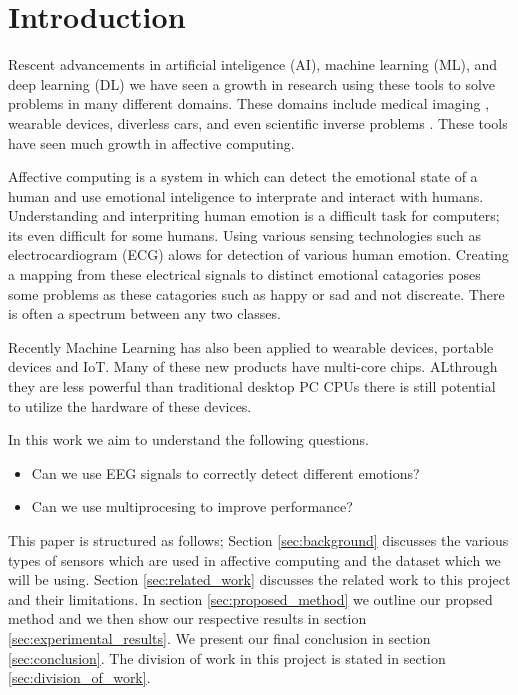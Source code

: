 \section{Introduction}
Rescent advancements in
artificial inteligence (AI),
machine learning (ML),
and deep learning (DL)
we have seen a growth in
research using these tools to
solve problems in many different domains.
These domains include medical imaging \cite{Greenspan:2016},
wearable devices,
diverless cars,
and even scientific inverse problems \cite{laanait2019exascale}.
These tools have seen much growth in affective computing.

Affective computing is a system in which can detect the
emotional state of a human and use emotional inteligence
to interprate and interact with humans.
Understanding and interpriting human emotion is a
difficult task for computers;
its even difficult for some humans.
Using various sensing technologies such as electrocardiogram (ECG)
alows for detection of various human emotion.
Creating a mapping from these electrical signals to
distinct emotional catagories poses some problems as
these catagories such as happy or sad and not discreate.
There is often a spectrum between any two classes.

Recently Machine Learning has also been applied to wearable devices,
portable devices and IoT.
Many of these new products have multi-core chips.
ALthrough they are less powerful than traditional desktop PC
CPUs there is still potential to utilize the hardware of these devices.

In this work we aim to understand the following questions.
\begin{itemize}
    \item Can we use EEG signals to correctly detect different emotions?
    \item Can we use multiprocesing to improve performance?
\end{itemize}

This paper is structured as follows;
Section \ref{sec:background} discusses the various types of sensors
which are used in affective computing and the dataset which we will be using.
%
Section \ref{sec:related_work} discusses the related work to this project
and their limitations.
%
In section \ref{sec:proposed_method} we outline our propsed method
and we then show our respective results in section \ref{sec:experimental_results}.
%
We present our final conclusion in section \ref{sec:conclusion}.
%
The division of work in this project is stated in section
\ref{sec:division_of_work}.
